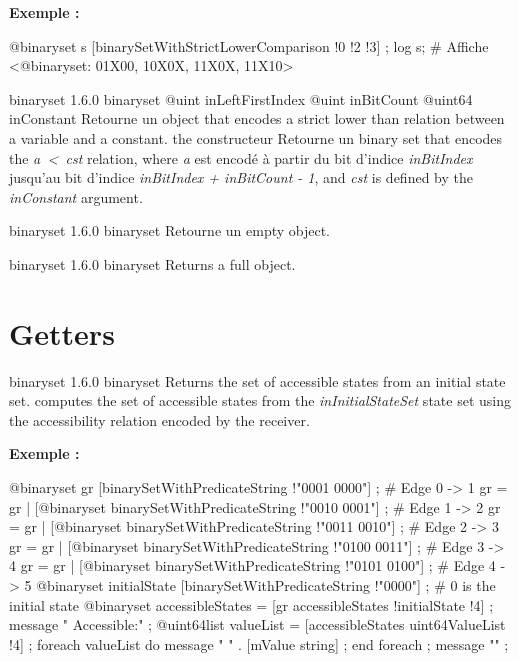 \textbf{Exemple :}
\begin{galgascode}
@binaryset s [binarySetWithStrictLowerComparison !0 !2 !3] ;
log s; # Affiche <@binaryset: 01X00, 10X0X, 11X0X, 11X10>
\end{galgascode}





{binaryset}
{1.6.0}
{binaryset}
{@uint inLeftFirstIndex}
{@uint inBitCount}
{@uint64 inConstant}
{Retourne un  object that encodes a strict lower than relation between a variable and a constant.}
{the constructeur Retourne un binary set that encodes the \emph{a~<~cst} relation, where \emph {a} est encodé à partir du bit d'indice \emph{inBitIndex} jusqu'au bit d'indice \emph{inBitIndex  + inBitCount - 1}, and \emph{cst} is defined by the \emph{inConstant} argument.}





{binaryset}
{1.6.0}
{binaryset}
{Retourne un empty  object.}
{}





{binaryset}
{1.6.0}
{binaryset}
{Returns a full  object.}
{}


\section{Getters}



{binaryset}
{1.6.0}
{binaryset}
{Returns the set of accessible states from an initial state set.}
{computes the set of accessible states from the \emph{inInitialStateSet} state set using the accessibility relation encoded by the receiver.}

\textbf{Exemple :}
\begin{galgascode}
@binaryset gr [binarySetWithPredicateString !"0001 0000"] ; # Edge 0 -> 1
gr = gr | [@binaryset binarySetWithPredicateString !"0010 0001"] ; # Edge 1 -> 2
gr = gr | [@binaryset binarySetWithPredicateString !"0011 0010"] ; # Edge 2 -> 3
gr = gr | [@binaryset binarySetWithPredicateString !"0100 0011"] ; # Edge 3 -> 4
gr = gr | [@binaryset binarySetWithPredicateString !"0101 0100"] ; # Edge 4 -> 5
@binaryset initialState [binarySetWithPredicateString !"0000"] ; # 0 is the initial state
@binaryset accessibleStates = [gr accessibleStates !initialState !4] ;
message " Accessible:" ;
@uint64list valueList = [accessibleStates uint64ValueList !4] ;
foreach valueList do
  message " " . [mValue string] ;
end foreach ;
message "\n" ;
\end{galgascode}


